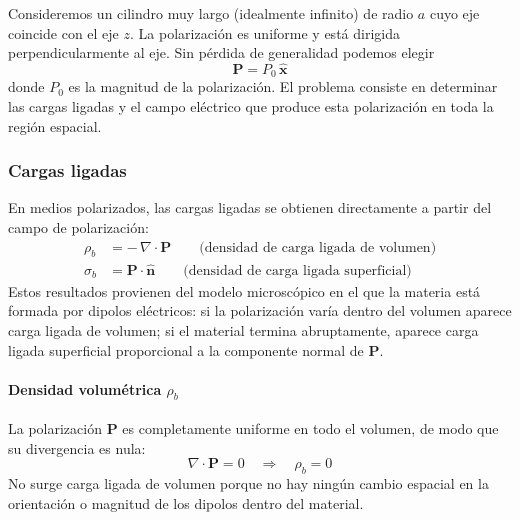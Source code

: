 \documentclass{article}
\begin{document}
Consideremos un cilindro muy largo (idealmente infinito) de radio $a$ cuyo eje 
coincide con el eje $z$. La polarización es uniforme y está dirigida 
perpendicularmente al eje. Sin pérdida de generalidad podemos elegir
\begin{equation}
\mathbf{P} = P_{0}\,\hat{\mathbf{x}}
\label{eq:P-cilindro-perp}
\end{equation}
donde $P_{0}$ es la magnitud de la polarización. El problema consiste en 
determinar las cargas ligadas y el campo eléctrico que produce esta 
polarización en toda la región espacial.

\subsubsection*{Cargas ligadas}

En medios polarizados, las cargas ligadas se obtienen directamente a partir del 
campo de polarización:
\begin{align}
\rho_{b} &= -\,\nabla\cdot\mathbf{P}
\qquad\text{(densidad de carga ligada de volumen)}
\label{eq:rho-b-def-3}\\[4pt]
\sigma_{b} &= \mathbf{P}\cdot\hat{\mathbf{n}}
\qquad\text{(densidad de carga ligada superficial)}
\label{eq:sigma-b-def-3}
\end{align}
Estos resultados provienen del modelo microscópico en el que la materia está 
formada por dipolos eléctricos: si la polarización varía dentro del volumen 
aparece carga ligada de volumen; si el material termina abruptamente, aparece 
carga ligada superficial proporcional a la componente normal de $\mathbf{P}$.

\paragraph{Densidad volumétrica $\rho_{b}$}

La polarización $\mathbf{P}$ es completamente uniforme en todo el volumen, de 
modo que su divergencia es nula:
\begin{equation}
\nabla\cdot\mathbf{P} = 0
\quad\Rightarrow\quad
\rho_{b} = 0
\label{eq:rho-b-3-final}
\end{equation}
No surge carga ligada de volumen porque no hay ningún cambio espacial en la 
orientación o magnitud de los dipolos dentro del material.
\end{document}
